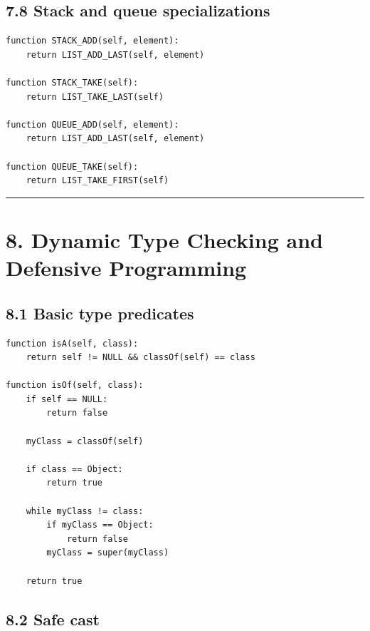 \documentclass[11pt]{article}
\begin{document}
\subsection{7.8 Stack and queue
specializations}\label{stack-and-queue-specializations}

\begin{verbatim}
function STACK_ADD(self, element):
    return LIST_ADD_LAST(self, element)

function STACK_TAKE(self):
    return LIST_TAKE_LAST(self)

function QUEUE_ADD(self, element):
    return LIST_ADD_LAST(self, element)

function QUEUE_TAKE(self):
    return LIST_TAKE_FIRST(self)
\end{verbatim}

\begin{center}\rule{0.5\linewidth}{0.5pt}\end{center}

\section{8. Dynamic Type Checking and Defensive
Programming}\label{dynamic-type-checking-and-defensive-programming}

\subsection{8.1 Basic type predicates}\label{basic-type-predicates}

\begin{verbatim}
function isA(self, class):
    return self != NULL && classOf(self) == class

function isOf(self, class):
    if self == NULL:
        return false

    myClass = classOf(self)

    if class == Object:
        return true

    while myClass != class:
        if myClass == Object:
            return false
        myClass = super(myClass)

    return true
\end{verbatim}

\subsection{8.2 Safe cast}\label{safe-cast}
\end{document}
